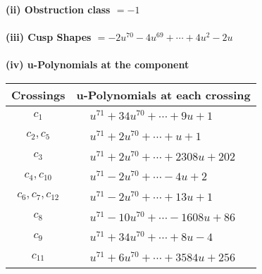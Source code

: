 \documentclass[1p]{elsarticle_modified}
\theoremstyle{definition}
\begin{document}
\flushleft \textbf{(ii) Obstruction class $= -1$}\\~\\
\flushleft \textbf{(iii) Cusp Shapes $= -2 u^{70}-4 u^{69}+\cdots+4 u^2-2 u$}\\~\\
\newpage\renewcommand{\arraystretch}{1}
\flushleft \textbf{(iv) u-Polynomials at the component}\newline \\
\begin{tabular}{m{50pt}|m{274pt}}
Crossings & \hspace{64pt}u-Polynomials at each crossing \\
\hline $$\begin{aligned}c_{1}\end{aligned}$$&$\begin{aligned}
&u^{71}+34 u^{70}+\cdots+9 u+1
\end{aligned}$\\
\hline $$\begin{aligned}c_{2},c_{5}\end{aligned}$$&$\begin{aligned}
&u^{71}+2 u^{70}+\cdots+u+1
\end{aligned}$\\
\hline $$\begin{aligned}c_{3}\end{aligned}$$&$\begin{aligned}
&u^{71}+2 u^{70}+\cdots+2308 u+202
\end{aligned}$\\
\hline $$\begin{aligned}c_{4},c_{10}\end{aligned}$$&$\begin{aligned}
&u^{71}-2 u^{70}+\cdots-4 u+2
\end{aligned}$\\
\hline $$\begin{aligned}c_{6},c_{7},c_{12}\end{aligned}$$&$\begin{aligned}
&u^{71}-2 u^{70}+\cdots+13 u+1
\end{aligned}$\\
\hline $$\begin{aligned}c_{8}\end{aligned}$$&$\begin{aligned}
&u^{71}-10 u^{70}+\cdots-1608 u+86
\end{aligned}$\\
\hline $$\begin{aligned}c_{9}\end{aligned}$$&$\begin{aligned}
&u^{71}+34 u^{70}+\cdots+8 u-4
\end{aligned}$\\
\hline $$\begin{aligned}c_{11}\end{aligned}$$&$\begin{aligned}
&u^{71}+6 u^{70}+\cdots+3584 u+256
\end{aligned}$\\
\hline
\end{tabular}\\~\\
\end{document}

